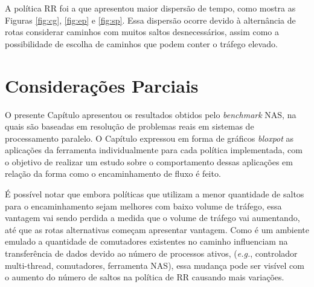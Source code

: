 A política RR foi a que apresentou maior dispersão de tempo, como mostra as Figuras  \ref{fig:cg}, \ref{fig:ep} e \ref{fig:sp}. Essa dispersão ocorre devido à alternância de rotas considerar caminhos com muitos saltos desnecessários, assim como a possibilidade de escolha de caminhos que podem conter o tráfego elevado. 


\section{Considerações Parciais}
\label{sec:consideracao_parcial}
O presente Capítulo apresentou os resultados obtidos pelo \textit{benchmark} NAS, na quais são baseadas em resolução de problemas reais em sistemas de processamento paralelo. O Capítulo expressou em forma de gráficos \textit{bloxpot} as aplicações da ferramenta individualmente para cada política implementada, com o objetivo de realizar um estudo sobre o comportamento dessas aplicações em relação da forma como o encaminhamento de fluxo é feito. 

É possível notar que embora políticas que utilizam a menor quantidade de saltos para o encaminhamento sejam melhores com baixo volume de tráfego, essa vantagem vai sendo perdida a medida que o volume de tráfego vai aumentando, até que as rotas alternativas começam apresentar vantagem. Como é um ambiente emulado a quantidade de comutadores existentes no caminho influenciam na transferência de dados devido ao número de processos ativos, (\textit{e.g.}, controlador multi-thread, comutadores, ferramenta NAS), essa mudança pode ser visível com o aumento do número de saltos na política de RR causando mais variações. 